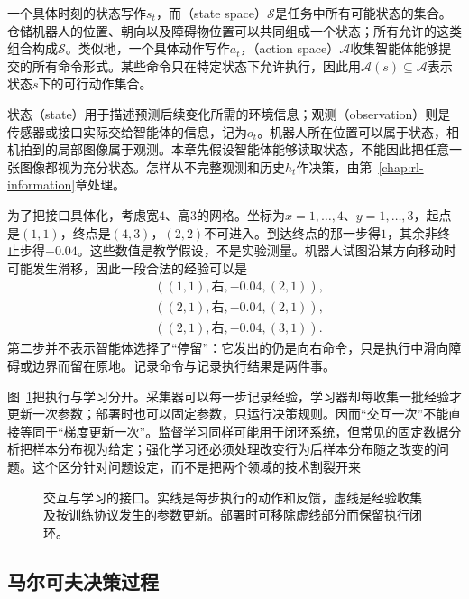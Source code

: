 一个具体时刻的状态写作$s_t$，而（state space）$\mathcal S$是任务中所有可能状态的集合。仓储机器人的位置、朝向以及障碍物位置可以共同组成一个状态；所有允许的这类组合构成$\mathcal S$。类似地，一个具体动作写作$a_t$，（action space）$\mathcal A$收集智能体能够提交的所有命令形式。某些命令只在特定状态下允许执行，因此用$\mathcal A(s)\subseteq\mathcal A$表示状态$s$下的可行动作集合。

状态（state）用于描述预测后续变化所需的环境信息；观测（observation）则是传感器或接口实际交给智能体的信息，记为$o_t$。机器人所在位置可以属于状态，相机拍到的局部图像属于观测。本章先假设智能体能够读取状态，不能因此把任意一张图像都视为充分状态。怎样从不完整观测和历史$h_t$作决策，由第~\ref{chap:rl-information}章处理。

为了把接口具体化，考虑宽$4$、高$3$的网格。坐标为$x=1,\ldots,4$、$y=1,\ldots,3$，起点是$(1,1)$，终点是$(4,3)$，$(2,2)$不可进入。到达终点的那一步得$1$，其余非终止步得$-0.04$。这些数值是教学假设，不是实验测量。机器人试图沿某方向移动时可能发生滑移，因此一段合法的经验可以是
\[
\begin{aligned}
 &((1,1),\text{右},-0.04,(2,1)),\\
 &((2,1),\text{右},-0.04,(2,1)),\\
 &((2,1),\text{右},-0.04,(3,1)).
\end{aligned}
\]
第二步并不表示智能体选择了“停留”：它发出的仍是向右命令，只是执行中滑向障碍或边界而留在原地。记录命令与记录执行结果是两件事。

图~\ref{fig:rl-overview-loop}把执行与学习分开。采集器可以每一步记录经验，学习器却每收集一批经验才更新一次参数；部署时也可以固定参数，只运行决策规则。因而“交互一次”不能直接等同于“梯度更新一次”。监督学习同样可能用于闭环系统，但常见的固定数据分析把样本分布视为给定；强化学习还必须处理改变行为后样本分布随之改变的问题。这个区分针对问题设定，而不是把两个领域的技术割裂开来

\begin{figure}[htbp]
  \centering
  
  \caption{交互与学习的接口。实线是每步执行的动作和反馈，虚线是经验收集及按训练协议发生的参数更新。部署时可移除虚线部分而保留执行闭环。}
  \label{fig:rl-overview-loop}
\end{figure}

\subsection{马尔可夫决策过程}
\label{sec:rl-overview-mdp}

